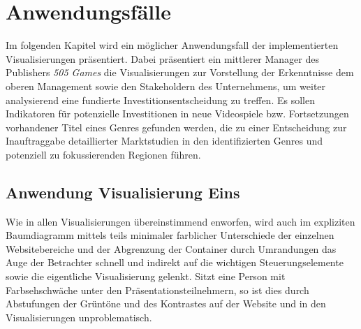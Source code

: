 \documentclass[usegeometry=true]{scrartcl}
\begin{document}
\section{Anwendungsfälle}
Im folgenden Kapitel wird ein möglicher Anwendungsfall der implementierten Visualisierungen präsentiert.
Dabei präsentiert ein mittlerer Manager des Publishers \textit{505 Games} die Visualisierungen zur Vorstellung der Erkenntnisse dem oberen Management sowie den Stakeholdern des Unternehmens, um weiter analysierend eine fundierte Investitionsentscheidung zu treffen. 
Es sollen Indikatoren für potenzielle Investitionen in neue Videospiele bzw. Fortsetzungen vorhandener Titel eines Genres gefunden werden, die zu einer Entscheidung zur Inauftraggabe detaillierter Marktstudien in den identifizierten Genres und potenziell zu fokussierenden Regionen führen.

\subsection{Anwendung Visualisierung Eins}
Wie in allen Visualisierungen übereinstimmend enworfen, wird auch im expliziten Baumdiagramm mittels teils minimaler farblicher Unterschiede der einzelnen Websitebereiche und der Abgrenzung der Container durch Umrandungen 
das Auge der Betrachter schnell und indirekt auf die wichtigen Steuerungselemente sowie die eigentliche Visualisierung gelenkt.
Sitzt eine Person mit Farbsehschwäche unter den Präsentationsteilnehmern, so ist dies durch Abstufungen der Grüntöne und des Kontrastes auf der Website und in den Visualisierungen unproblematisch. 
\end{document}
